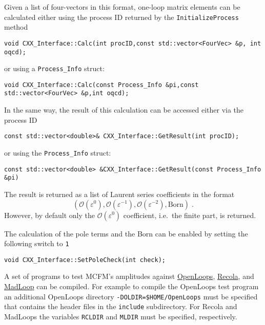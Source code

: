 Given a list of four-vectors in this format, one-loop matrix elements
can be calculated either using the process ID returned by the
{\verb!InitializeProcess!} method

\begin{verbatim}
void CXX_Interface::Calc(int procID,const std::vector<FourVec> &p, int oqcd);
\end{verbatim}

or using a {\verb!Process_Info!} struct:

\begin{verbatim}
void CXX_Interface::Calc(const Process_Info &pi,const std::vector<FourVec> &p,int oqcd);
\end{verbatim}

In the same way, the result of this calculation can be accessed either
via the process ID

\begin{verbatim}
const std::vector<double>& CXX_Interface::GetResult(int procID);
\end{verbatim}

or using the {\verb!Process_Info!} struct:

\begin{verbatim}
const std::vector<double> &CXX_Interface::GetResult(const Process_Info &pi)
\end{verbatim}

The result is returned as a list of Laurent series coefficients in the
format
\begin{equation*}
(\mathcal{O}(\varepsilon^0), \mathcal{O}(\varepsilon^{-1}), \mathcal{O}(\varepsilon^{-2}), \mathrm{Born})
\;.
\end{equation*}
However, by default only the \(\mathcal{O}(\varepsilon^0)\) coefficient,
i.e.~the finite part, is returned.

The calculation of the pole terms and the Born can be enabled by setting
the following switch to {\verb!1!}

\begin{verbatim}
void CXX_Interface::SetPoleCheck(int check);
\end{verbatim}

\hypertarget{tests}{%
\label{tests}}

A set of programs to test MCFM's amplitudes against
\href{https://openloops.hepforge.org}{OpenLoops},
\href{https://recola.gitlab.io/recola2/}{Recola}, and
\href{http://madgraph.phys.ucl.ac.be}{MadLoop} can be compiled. For
example to compile the OpenLoops test program an additional OpenLoops
directory {\verb!-DOLDIR=$HOME/OpenLoops!} must be
specified that contains the header files in the
{\verb!include!} subdirectory. For Recola and MadLoops
the variables {\verb!RCLDIR!} and
{\verb!MLDIR!} must be specified, respectively.


